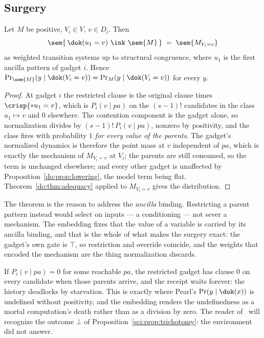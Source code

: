 \subsection{Surgery}

\begin{theorem}
\label{do:thm:surgery}
Let $M$ be positive, $V_i \in V$, $v \in D_i$. Then
\[
  \sem{\,\dok(u_1 = v)\ \ink\ \sem{M}\,} \;=\; \sem{M_{V_i = v}}
\]
as weighted transition systems up to structural congruence, where $u_1$ is the first ancilla
pattern of gadget $i$. Hence $\Pr_{\sem{M}}(y \mid \dok(V_i = v)) = \Pr_{M}(y \mid \dok(V_i = v))$
for every $y$.
\end{theorem}

\begin{proof}
At gadget $i$ the restricted clause is the original clause times $\crisp{*u_1 = v}$, which is
$P_i(v \mid \mathit{pa})$ on the $(s-1)!$ candidates in the class $u_1 \mapsto v$ and $0$
elsewhere. The contention component is the gadget alone, so normalization divides by
$(s-1)!\,P_i(v \mid \mathit{pa})$, nonzero by positivity, and the class fires with probability $1$
\emph{for every value of the parents}. The gadget's normalized dynamics is therefore the point mass
at $v$ independent of $\mathit{pa}$, which is exactly the mechanism of $M_{V_i=v}$ at $V_i$; the
parents are still consumed, so the term is unchanged elsewhere; and every other gadget is unaffected
by Proposition~\ref{do:prop:lowering}, the model term being flat. Theorem~\ref{do:thm:adequacy}
applied to $M_{V_i=v}$ gives the distribution.
\end{proof}

The theorem is the reason to address the \emph{ancilla} binding. Restricting a parent pattern
instead would select on inputs --- a conditioning --- not sever a mechanism. The embedding fixes
that the value of a variable is carried by its ancilla binding, and that is the whole of what makes
the surgery exact: the gadget's own gate is $\top$, so restriction and override coincide, and the
weights that encoded the mechanism are the thing normalization discards.

\begin{remark}
\label{do:rmk:positivity}
If $P_i(v \mid \mathit{pa}) = 0$ for some reachable $\mathit{pa}$, the restricted gadget has clause
$0$ on every candidate when those parents arrive, and the receipt waits forever: the history
deadlocks by starvation. This is exactly where Pearl's $\Pr(y \mid \dok(x))$ is undefined without
positivity, and the embedding renders the undefinedness as a mortal computation's death rather than
as a division by zero. The reader of \chSci\ will recognize the outcome $\bot$ of
Proposition~\ref{sci:prop:trichotomy}: the environment did not answer.
\end{remark}

